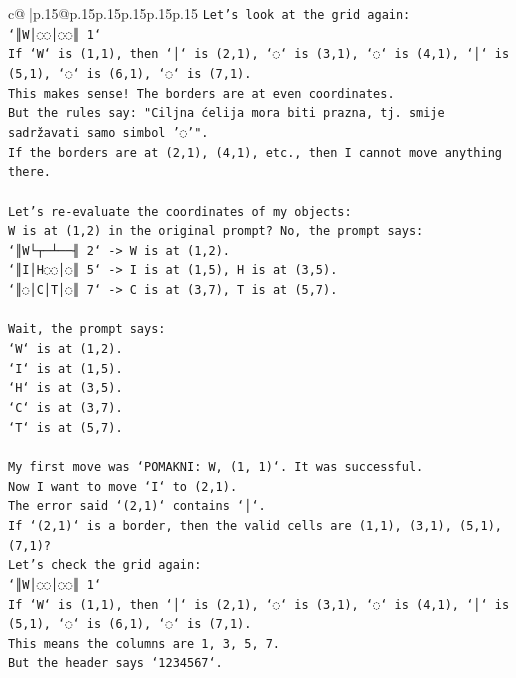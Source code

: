 \documentclass{article}
\begin{document}
{\begin{supertabular}{c@{$\;$}|p{.15\linewidth}@{}p{.15\linewidth}p{.15\linewidth}p{.15\linewidth}p{.15\linewidth}p{.15\linewidth}}
{{{\texttt{Let's look at the grid again:} \\
\texttt{`║W│◌◌│◌◌║ 1`} \\
\texttt{If `W` is (1,1), then `│` is (2,1), `◌` is (3,1), `◌` is (4,1), `│` is (5,1), `◌` is (6,1), `◌` is (7,1).} \\
\texttt{This makes sense! The borders are at even coordinates.} \\
\texttt{But the rules say: "Ciljna ćelija mora biti prazna, tj. smije sadržavati samo simbol '◌'".} \\
\texttt{If the borders are at (2,1), (4,1), etc., then I cannot move anything there.} \\
\\ 
\texttt{Let's re{-}evaluate the coordinates of my objects:} \\
\texttt{W is at (1,2) in the original prompt? No, the prompt says:} \\
\texttt{`║W└┬─┴──╢ 2` {-}> W is at (1,2).} \\
\texttt{`║I│H◌◌│◌║ 5` {-}> I is at (1,5), H is at (3,5).} \\
\texttt{`║◌│C│T│◌║ 7` {-}> C is at (3,7), T is at (5,7).} \\
\\ 
\texttt{Wait, the prompt says:} \\
\texttt{`W` is at (1,2).} \\
\texttt{`I` is at (1,5).} \\
\texttt{`H` is at (3,5).} \\
\texttt{`C` is at (3,7).} \\
\texttt{`T` is at (5,7).} \\
\\ 
\texttt{My first move was `POMAKNI: W, (1, 1)`. It was successful.} \\
\texttt{Now I want to move `I` to (2,1).} \\
\texttt{The error said `(2,1)` contains `│`.} \\
\texttt{If `(2,1)` is a border, then the valid cells are (1,1), (3,1), (5,1), (7,1)?} \\
\texttt{Let's check the grid again:} \\
\texttt{`║W│◌◌│◌◌║ 1`} \\
\texttt{If `W` is (1,1), then `│` is (2,1), `◌` is (3,1), `◌` is (4,1), `│` is (5,1), `◌` is (6,1), `◌` is (7,1).} \\
\texttt{This means the columns are 1, 3, 5, 7.} \\
\texttt{But the header says `1234567`.} \\
}}}
\end{supertabular}}
\end{document}
